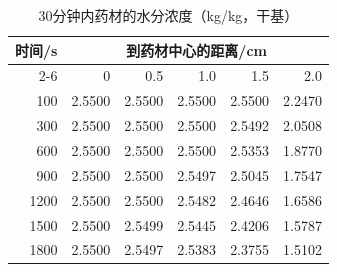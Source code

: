 \begin{table}[htbp]
\centering
\caption{30分钟内药材的水分浓度（kg/kg，干基）}
\label{tab:q1-moisture}
\begin{tabular}{rrrrrr}
\toprule
时间/s & \multicolumn{5}{c}{到药材中心的距离/cm} \\
\cmidrule(lr){2-6}
 & 0 & 0.5 & 1.0 & 1.5 & 2.0 \\
\midrule
100 & 2.5500 & 2.5500 & 2.5500 & 2.5500 & 2.2470 \\
300 & 2.5500 & 2.5500 & 2.5500 & 2.5492 & 2.0508 \\
600 & 2.5500 & 2.5500 & 2.5500 & 2.5353 & 1.8770 \\
900 & 2.5500 & 2.5500 & 2.5497 & 2.5045 & 1.7547 \\
1200 & 2.5500 & 2.5500 & 2.5482 & 2.4646 & 1.6586 \\
1500 & 2.5500 & 2.5499 & 2.5445 & 2.4206 & 1.5787 \\
1800 & 2.5500 & 2.5497 & 2.5383 & 2.3755 & 1.5102 \\
\bottomrule
\end{tabular}
\end{table}
